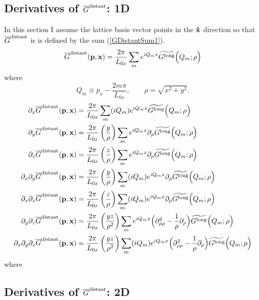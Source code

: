 \documentclass[letterpaper]{article}
\newcommand{\GB}{\overline{G}}
\newcommand{\wt}{\widetilde}
\begin{document}
\subsection{Derivatives of $\GB\sups{distant}$: 1D}

In this section I assume the lattice basis vector points
in the $\mathbf{\hat x}$ direction so that $\GB\sups{distant}$ is 
is defined by the sum (\ref{GDistantSum1}).
\begin{align*}
  \overline{G}\sups{distant}(\vb p, \vb x) 
  =\frac{2\pi}{L_{0x}} \sum_{m} e^{i Q_m x}
   \wt{G\sups{long}}\Big( Q_m; \rho\Big)
\end{align*}
where 
$$Q_m \equiv p_x - \frac{2m\pi}{L_{0x}}, \qquad \rho=\sqrt{x^2 + y^2}.$$
\begin{align*}
 \partial_x 
  \overline{G}\sups{distant}(\vb p, \vb x) 
 &=\frac{2\pi}{L_{0x}} \sum_{m} (iQ_m) e^{i Q_m x}
   \wt{G\sups{long}}\Big( Q_m; \rho\Big)
\\
 \partial_y 
  \overline{G}\sups{distant}(\vb p, \vb x) 
 &=\frac{2\pi}{L_{0x}} \pf{y}{\rho} \sum_{m} e^{i Q_m x}
   \partial_\rho \wt{G\sups{long}}\Big( Q_m; \rho\Big)
\\
 \partial_z 
  \overline{G}\sups{distant}(\vb p, \vb x) 
 &=\frac{2\pi}{L_{0x}} \pf{z}{\rho} \sum_{m} e^{i Q_m x}
   \partial_\rho \wt{G\sups{long}}\Big( Q_m; \rho\Big)
\\
 \partial_x \partial_y
  \overline{G}\sups{distant}(\vb p, \vb x) 
 &=\frac{2\pi}{L_{0x}} \pf{y}{\rho} \sum_{m} (iQ_m) e^{i Q_m x}
   \partial_\rho \wt{G\sups{long}}\Big( Q_m; \rho\Big)
\\
 \partial_x \partial_z
  \overline{G}\sups{distant}(\vb p, \vb x) 
 &=\frac{2\pi}{L_{0x}} \pf{z}{\rho} \sum_{m} (iQ_m) e^{i Q_m x}
   \partial_\rho \wt{G\sups{long}}\Big( Q_m; \rho\Big)
\\
 \partial_y \partial_z
  \overline{G}\sups{distant}(\vb p, \vb x) 
 &=\frac{2\pi}{L_{0x}} \pf{yz}{\rho^2} \sum_{m} e^{i Q_m x}
   \Big( \partial^2_{\rho\rho} -\frac{1}{\rho}\partial_\rho\Big)
   \wt{G\sups{long}}\Big( Q_m; \rho\Big)
\\
 \partial_x \partial_y \partial_z
  \overline{G}\sups{distant}(\vb p, \vb x) 
 &=\frac{2\pi}{L_{0x}} \pf{yz}{\rho^2} \sum_{m} (iQ_m) e^{i Q_m x}
   \Big( \partial^2_{\rho\rho} -\frac{1}{\rho}\partial_\rho\Big)
   \wt{G\sups{long}}\Big( Q_m; \rho\Big)
\end{align*}
where 

\subsection{Derivatives of $\GB\sups{distant}$: 2D}
\end{document}
